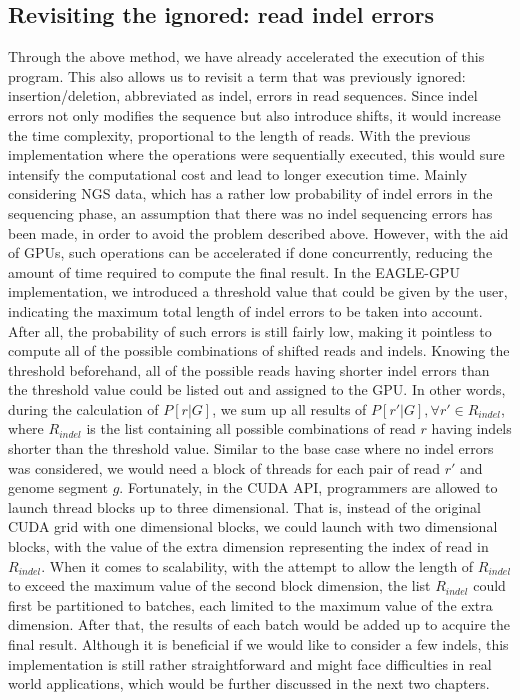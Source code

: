 \documentclass{PHlab-thesis}
\begin{document}
\subsection{Revisiting the ignored: read indel errors}
Through the above method, we have already accelerated the execution of this program. This also allows us to revisit a term that was previously ignored: insertion/deletion, abbreviated as indel, errors in read sequences. Since indel errors not only modifies the sequence but also introduce shifts, it would increase the time complexity, proportional to the length of reads. With the previous implementation where the operations were sequentially executed, this would sure intensify the computational cost and lead to longer execution time. Mainly considering NGS data, which has a rather low probability of indel errors in the sequencing phase, an assumption that there was no indel sequencing errors has been made, in order to avoid the problem described above. However, with the aid of GPUs, such operations can be accelerated if done concurrently, reducing the amount of time required to compute the final result. In the EAGLE-GPU implementation, we introduced a threshold value that could be given by the user, indicating the maximum total length of indel errors to be taken into account. After all, the probability of such errors is still fairly low, making it pointless to compute all of the possible combinations of shifted reads and indels. Knowing the threshold beforehand, all of the possible reads having shorter indel errors than the threshold value could be listed out and assigned to the GPU. In other words, during the calculation of $P[r|G]$, we sum up all results of $P[r'|G], \forall r' \in R_{indel}$, where $R_{indel}$ is the list containing all possible combinations of read $r$ having indels shorter than the threshold value. Similar to the base case where no indel errors was considered, we would need a block of threads for each pair of read $r'$ and genome segment $g$. Fortunately, in the CUDA API, programmers are allowed to launch thread blocks up to three dimensional. That is, instead of the original CUDA grid with one dimensional blocks, we could launch with two dimensional blocks, with the value of the extra dimension representing the index of read in $R_{indel}$. When it comes to scalability, with the attempt to allow the length of $R_{indel}$ to exceed the maximum value of the second block dimension, the list $R_{indel}$ could first be partitioned to batches, each limited to the maximum value of the extra dimension. After that, the results of each batch would be added up to acquire the final result. Although it is beneficial if we would like to consider a few indels, this implementation is still rather straightforward and might face difficulties in real world applications, which would be further discussed in the next two chapters.
\end{document}
